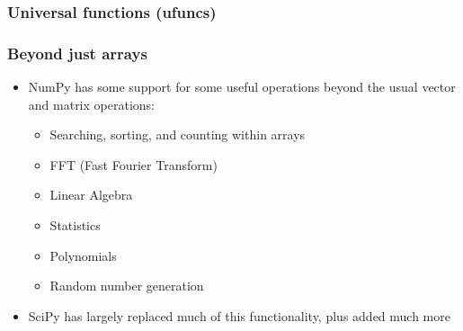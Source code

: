 \documentclass[12pt,letterpaper,twoside]{article}
\begin{document}
\begin{python}
\begin{Highlighting}[]
\end{Highlighting}
\end{python}

\hypertarget{universal-functions-ufuncs}{%
\subsubsection{Universal functions
(ufuncs)}\label{universal-functions-ufuncs}}

\begin{python}
\begin{Highlighting}[]
\OperatorTok{=}\OperatorTok{=}
\end{Highlighting}
\end{python}

\begin{python}
\begin{Highlighting}[]
\end{Highlighting}
\end{python}

\begin{python}
\begin{Highlighting}[]
\end{Highlighting}
\end{python}

\hypertarget{beyond-just-arrays}{%
\subsubsection{Beyond just arrays}\label{beyond-just-arrays}}

\begin{itemize}
\item
  NumPy has some support for some useful operations beyond the usual
  vector and matrix operations:

  \begin{itemize}
  \item
    Searching, sorting, and counting within arrays
  \item
    FFT (Fast Fourier Transform)
  \item
    Linear Algebra
  \item
    Statistics
  \item
    Polynomials
  \item
    Random number generation
  \end{itemize}
\item
  SciPy has largely replaced much of this functionality, plus added much
  more
\end{itemize}
\end{document}
